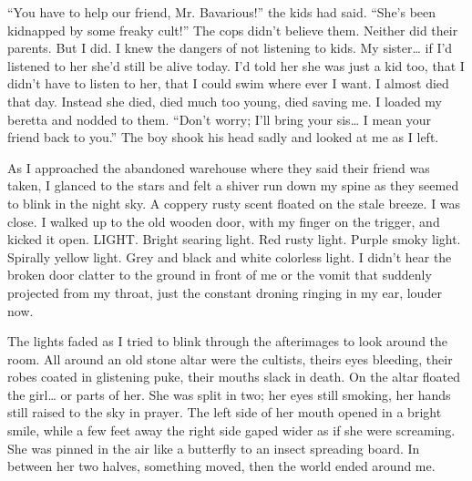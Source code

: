 ``You have to help our friend, Mr. Bavarious!'' the kids
had said. ``She's been kidnapped by some freaky
cult!'' The cops didn't believe them. Neither did their
parents. But I did. I knew the dangers of not listening to kids. My
sister{\ldots} if I'd listened to her she'd still be
alive today. I'd told her she was just a kid too, that I
didn't have to listen to her, that I could swim where ever I
want. I almost died that day. Instead she died, died much too
young, died saving me. I loaded my beretta and nodded to them.
``Don't worry; I'll bring your sis{\ldots} I mean
your friend back to you.'' The boy shook his head sadly and
looked at me as I left.



As I approached the abandoned warehouse where they said their
friend was taken, I glanced to the stars and felt a shiver run down
my spine as they seemed to blink in the night sky. A coppery rusty
scent floated on the stale breeze. I was close. I walked up to the
old wooden door, with my finger on the trigger, and kicked it open.
LIGHT. Bright searing light. Red rusty light. Purple smoky light.
Spirally yellow light. Grey and black and white colorless light. I
didn't hear the broken door clatter to the ground in front of
me or the vomit that suddenly projected from my throat, just the
constant droning ringing in my ear, louder now.



The lights faded as I tried to blink through the afterimages to
look around the room. All around an old stone altar were the
cultists, theirs eyes bleeding, their robes coated in glistening
puke, their mouths slack in death. On the altar floated the
girl{\ldots} or parts of her. She was split in two; her eyes still
smoking, her hands still raised to the sky in prayer. The left side
of her mouth opened in a bright smile, while a few feet away the
right side gaped wider as if she were screaming. She was pinned in
the air like a butterfly to an insect spreading board. In between
her two halves, something moved, then the world ended around
me.



